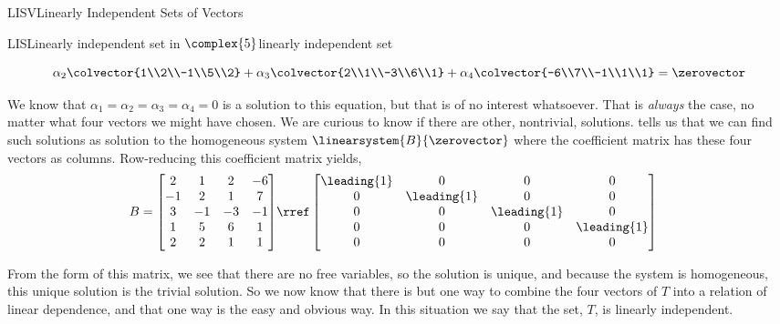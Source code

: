 \begin{subsect}{LISV}{Linearly Independent Sets of Vectors}
\begin{example}{LIS}{Linearly independent set in $\complex{5}$}{linearly independent set}
\begin{para}
\begin{equation*}
\alpha_2\colvector{1\\2\\-1\\5\\2}+
\alpha_3\colvector{2\\1\\-3\\6\\1}+
\alpha_4\colvector{-6\\7\\-1\\1\\1}
=\zerovector
\end{equation*}
\end{para}
%
\begin{para}We know that $\alpha_1=\alpha_2=\alpha_3=\alpha_4=0$ is a solution to this equation, but that is of no interest whatsoever.  That is {\em always} the case, no matter what four vectors we might have chosen.  We are curious to know if there are other, nontrivial, solutions.   tells us that we can find such solutions as solution to the homogeneous system $\linearsystem{B}{\zerovector}$ where the coefficient matrix has these four vectors as columns.  Row-reducing this coefficient matrix yields,
%
\begin{align*}
B=
\begin{bmatrix}
2&1&2&-6\\
-1&2&1&7\\
3&-1&-3&-1\\
1&5&6&1\\
2&2&1&1
\end{bmatrix}
&\rref
\begin{bmatrix}
\leading{1}&0&0&0\\
0&\leading{1}&0&0\\
0&0&\leading{1}&0\\
0&0&0&\leading{1}\\
0&0&0&0
\end{bmatrix}
\end{align*}
\end{para}
%
\begin{para}From the form of this matrix, we see that there are no free variables, so the solution is unique, and because the system is homogeneous, this unique solution is the trivial solution.  So we now know that there is but one way to combine the four vectors of $T$ into a relation of linear dependence, and that one way is the easy and obvious way.  In this situation we say that the set, $T$, is linearly independent.

\end{para}
\end{example}
\end{subsect}
